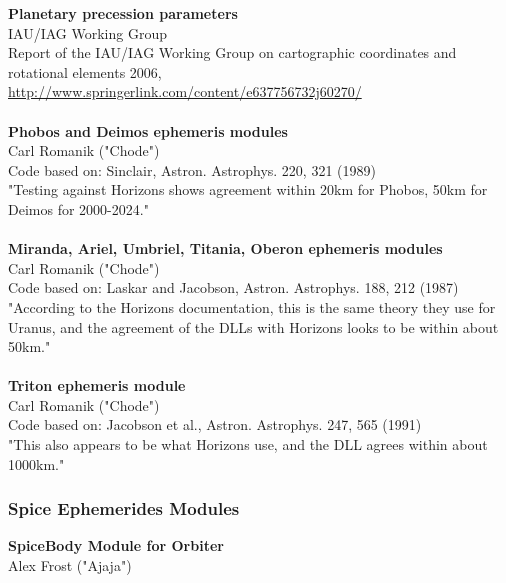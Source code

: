 \documentclass[Orbiter User Manual.tex]{subfiles}
\begin{document}
\textbf{Planetary precession parameters}\\
IAU/IAG Working Group\\
Report of the IAU/IAG Working Group on cartographic coordinates and rotational elements 2006, \url{http://www.springerlink.com/content/e637756732j60270/}\\
\\
\textbf{Phobos and Deimos ephemeris modules}\\
Carl Romanik ("Chode")\\
Code based on: Sinclair, Astron. Astrophys. 220, 321 (1989)\\
"Testing against Horizons shows agreement within 20km for Phobos, 50km for Deimos for 2000-2024."\\
\\
\textbf{Miranda, Ariel, Umbriel, Titania, Oberon ephemeris modules}\\
Carl Romanik ("Chode")\\
Code based on: Laskar and Jacobson, Astron. Astrophys. 188, 212 (1987)\\
"According to the Horizons documentation, this is the same theory they use for Uranus, and the agreement of the DLLs with Horizons looks to be within about 50km."\\
\\
\textbf{Triton ephemeris module}\\
Carl Romanik ("Chode")\\
Code based on: Jacobson et al., Astron. Astrophys. 247, 565 (1991)\\
"This also appears to be what Horizons use, and the DLL agrees within about 1000km."
\\
\subsubsection{Spice Ephemerides Modules}
\textbf{SpiceBody Module for Orbiter}\\
Alex Frost ("Ajaja")\\
\end{document}
